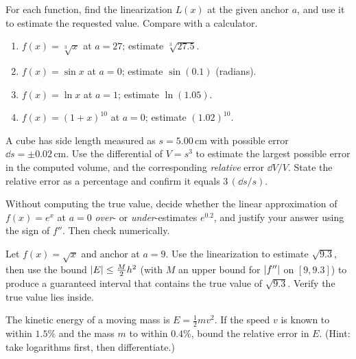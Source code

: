 \begin{exercise}
For each function, find the linearization $L(x)$ at the given anchor $a$, and use
it to estimate the requested value. Compare with a calculator.
\begin{enumerate}
\item $f(x)=\sqrt[3]{x}$ at $a=27$; estimate $\sqrt[3]{27.5}$.
\item $f(x)=\sin x$ at $a=0$; estimate $\sin(0.1)$ (radians).
\item $f(x)=\ln x$ at $a=1$; estimate $\ln(1.05)$.
\item $f(x)=(1+x)^{10}$ at $a=0$; estimate $(1.02)^{10}$.
\end{enumerate}
\end{exercise}

\begin{exercise}
A cube has side length measured as $s = 5.00\,\text{cm}$ with possible error
$\dd s = \pm 0.02\,\text{cm}$. Use the differential of $V=s^3$ to estimate the largest possible
error in the computed volume, and the corresponding \emph{relative} error
$\dd V/V$. State the relative error as a percentage and confirm it equals
$3\,(\dd s/s)$.
\end{exercise}

\begin{exercise}
Without computing the true value, decide whether the linear approximation of
$f(x)=e^x$ at $a=0$ \emph{over}- or \emph{under}-estimates $e^{0.2}$, and justify
your answer using the sign of $f''$. Then check numerically.
\end{exercise}

\begin{exercise}
Let $f(x) = \sqrt{x}$ and anchor at $a=9$. Use the linearization to estimate
$\sqrt{9.3}$, then use the bound $\lvert E\rvert\le \tfrac{M}{2}h^2$ (with $M$ an upper
bound for $\lvert f''\rvert$ on $[9,9.3]$) to produce a guaranteed interval that
contains the true value of $\sqrt{9.3}$. Verify the true value lies inside.
\end{exercise}

\begin{exercise}
The kinetic energy of a moving mass is $E = \tfrac12 m v^2$. If the speed $v$ is
known to within $1.5\%$ and the mass $m$ to within $0.4\%$, bound the relative
error in $E$. (Hint: take logarithms first, then differentiate.)
\end{exercise}

